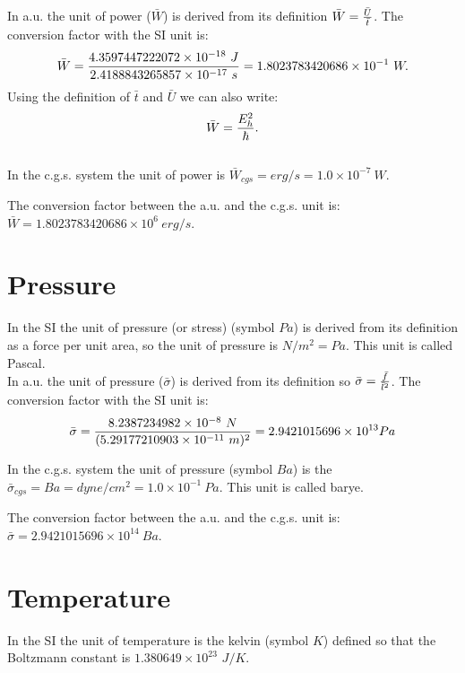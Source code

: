 \documentclass[12pt,a4paper]{article}
\def\barl{5.29177210903\times 10^{-11}}
\def\bart{2.4188843265857\times 10^{-17}}
\def\barf{8.2387234982\times 10^{-8}}
\def\baru{4.3597447222072\times 10^{-18}}
\def\barw{1.8023783420686\times 10^{-1}}
\def\barpr{2.9421015696\times 10^{13}}
\def\utou{1.0\times 10^{-7}}
\def\prtopr{1.0\times 10^{-1}}
\def\barwcgs{1.8023783420686\times 10^{6}}
\def\barprcgs{2.9421015696\times 10^{14}}
\begin{document}
{\color{web-blue} In a.u. the unit of power ($\bar W$) is derived 
from its definition $\bar W ={\bar U \over \bar t}$. The
conversion factor with the SI unit is: 
\begin{equation}
\bar W = {\baru\ J\over \bart\ s}=\barw\ W. 
\end{equation}
Using the definition of $\bar t$ and $\bar U$ we can also write:
\begin{equation}
\bar W = {E_h^2 \over \hbar}.
\end{equation}
}
\\

{\color{orange} In the c.g.s. system the unit of power is 
$\bar W_{cgs} = erg/s = \utou\ W$. 
\\
}

{\color{green} The conversion factor between the a.u. and the c.g.s. unit is:
$\bar W=\barwcgs\ erg/s$.
}

\newpage
\section{\color{coral}Pressure}
In the SI the unit of pressure (or stress) (symbol $Pa$) is derived 
from its definition as a force per unit area, so 
the unit of pressure is $N/m^2=Pa$. This unit is called Pascal.
\\

{\color{web-blue} In a.u. the unit of pressure ($\bar \sigma$) is derived from 
its definition so $\bar \sigma= {\bar f \over \bar l^2}$. The conversion
factor with the SI unit is:
\begin{equation}
\bar \sigma= {\barf\ N \over (\barl\ m )^2}=\barpr Pa
\end{equation}
}

{\color{orange} In the c.g.s. system the unit of pressure (symbol $Ba$)
is the $\bar \sigma_{cgs}=Ba=dyne/cm^2 = \prtopr\ Pa$. This unit is 
called barye. 
\\
}

{\color{green} The conversion factor between the a.u. and the c.g.s. unit is:
$\bar \sigma=\barprcgs\ Ba$.
}


\newpage
\section{\color{coral}Temperature}
In the SI the unit of temperature is the kelvin (symbol $K$) defined
so that the Boltzmann constant is $1.380649\times 10^{23}$ $J / K$.
\\
\end{document}
